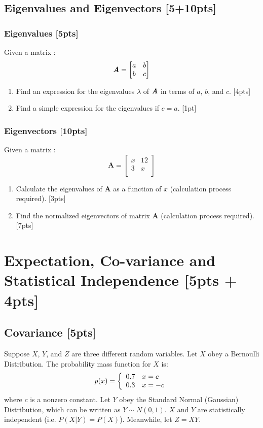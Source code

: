 \documentclass{article}
\begin{document}
\subsection{Eigenvalues and Eigenvectors [5+10pts]}
\subsubsection{Eigenvalues [5pts]}
Given a matrix :
$$\textbf{\textit{A}}=\begin{bmatrix}
    a & b \\
    b & c
\end{bmatrix}$$
\begin{enumerate}[label=(\alph*)]
    \item Find an expression for the eigenvalues $\lambda$ of $\textbf{\textit{A}}$ in terms of $a$, $b$, and $c$. [4pts]
    \item Find a simple expression for the eigenvalues if $c= a$. [1pt]
\end{enumerate}


\subsubsection{Eigenvectors [10pts]}
Given a matrix :
$$\boldsymbol{A} = \begin{bmatrix} 
    x & 12  \\ 
    3 & x \\
\end{bmatrix}$$
\begin{enumerate}[label=(\alph*)]
    \item Calculate the eigenvalues of $\boldsymbol{A}$ as a function of $x$ (calculation process required). [3pts]
    \item Find the normalized eigenvectors of matrix $\boldsymbol{A}$ (calculation process required). [7pts]
\end{enumerate}



\newpage
\section{Expectation, Co-variance and Statistical Independence [5pts + 4pts]}
\subsection{Covariance [5pts]}
Suppose $X$, $Y$, and $Z$ are three different random variables.
Let $X$ obey a Bernoulli Distribution. The probability mass function for $X$ is:
    $$p(x)=\left\{
    \begin{array}{ c l} 
        0.7 & x = c\\
        0.3 & x = -c
    \end{array}\right.$$
where $c$ is a nonzero constant. Let $Y$ obey the Standard Normal (Gaussian) Distribution, which can be written as $Y \sim N(0,1)$. $X$ and $Y$ are statistically independent (i.e. $P(X|Y) = P(X)$). Meanwhile, let $Z = XY$. \\
\end{document}
